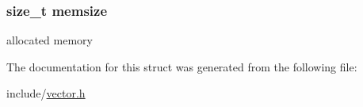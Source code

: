\subsubsection[{\texorpdfstring{memsize}{memsize}}]{\setlength{\rightskip}{0pt plus 5cm}size\+\_\+t memsize}\hypertarget{structvector__t_a1fd8d6cf6c295e3ba28941c0f63894a8}{}\label{structvector__t_a1fd8d6cf6c295e3ba28941c0f63894a8}
allocated memory 

The documentation for this struct was generated from the following file\+:\begin{DoxyCompactItemize}
\item 
include/\hyperlink{vector_8h}{vector.\+h}\end{DoxyCompactItemize}
